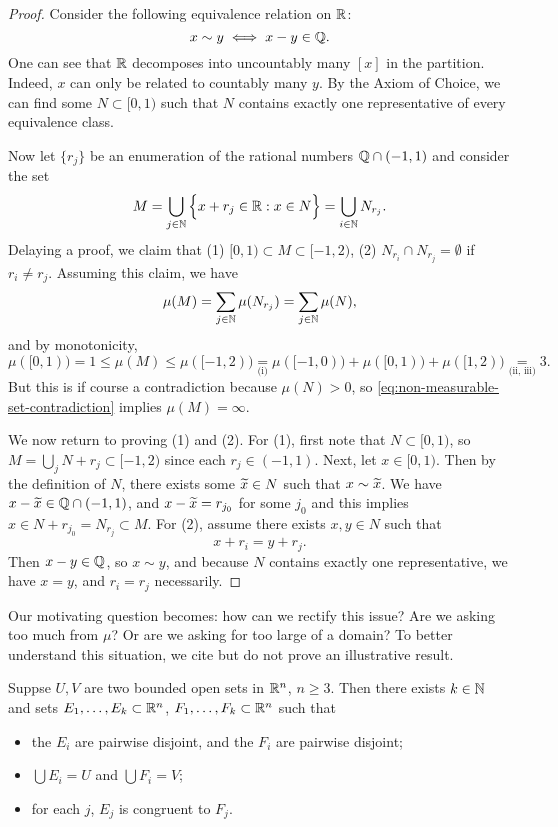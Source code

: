 \documentclass[12pt]{article} %
\begin{document}
\begin{proof}
    Consider the following equivalence relation on $\mathbb{R}$: \[x \sim y \iff x - y \in \mathbb{Q}.\] One can see that $\mathbb{R}$ decomposes into uncountably many $[x]$ in the partition. Indeed, $x$ can only be related to countably many $y$. By the Axiom of Choice, we can find some $N \subset [0,1)$ such that $N$ contains exactly one representative of every equivalence class.

    Now let $\{r_j\}$ be an enumeration of the rational numbers $\mathbb{Q} \cap (-1,1)$ and consider the set \[M = \bigcup_{j \in \mathbb{N}} \Big\{x + r_j \in \mathbb{R} : x \in N \Big\} = \bigcup_{i \in \mathbb{N}} N_{r_j}.\] Delaying a proof, we claim that (1) $[0,1) \subset M \subset [-1,2)$, (2) $N_{r_i} \cap N_{r_j} = \emptyset$ if $r_i \neq r_j$. Assuming this claim, we have \begin{align}\label{eq:non-measurable-set-contradiction}
        \mu(M) = \sum_{j \in \mathbb{N}} \mu(N_{r_j}) = \sum_{j \in \mathbb{N}} \mu(N),
    \end{align} and by monotonicity, \[\mu([0,1)) = 1 \leq \mu(M) \leq \mu([-1,2)) \underset{\text{(i)}}{=} \mu([-1,0)) + \mu([0,1)) + \mu([1,2)) \underset{\text{(ii, iii)}}{=} 3.\] But this is if course a contradiction because $\mu(N) > 0$, so \cref{eq:non-measurable-set-contradiction} implies $\mu(M) = \infty$.

    We now return to proving (1) and (2). For (1), first note that $N \subset [0,1)$, so $M = \bigcup_j N + r_j \subset [-1,2)$ since each $r_j \in (-1,1)$. Next, let $x \in [0,1)$. Then by the definition of $N$, there exists some $\widetilde{x} \in N$ such that $x \sim \widetilde{x}$. We have $x - \widetilde{x} \in \mathbb{Q} \cap (-1, 1)$, and $x-\widetilde{x} = r_{j_0}$ for some $j_0$ and this implies $x \in N + r_{j_0} = N_{r_j} \subset M$. For (2), assume there exists $x, y \in N$ such that \[x + r_i = y + r_j.\] Then $x - y \in \mathbb{Q}$, so $x \sim y$, and because $N$ contains exactly one representative, we have $x = y$, and $r_i = r_j$ necessarily.
\end{proof}

Our motivating question becomes: how can we rectify this issue? Are we asking too much from $\mu$? Or are we asking for too large of a domain? To better understand this situation, we cite but do not prove an illustrative result.

\begin{theorem}
    Suppse $U, V$ are two bounded open sets in $\mathbb{R}^n$, $n \geq 3$. Then there exists $k 
    \in \mathbb{N}$ and sets $E_1, \ldots, E_k \subset \mathbb{R}^n$, $F_1, \ldots, F_k \subset \mathbb{R}^n$ such that \begin{itemize}
        \item the $E_i$ are pairwise disjoint, and the $F_i$ are pairwise disjoint;
        \item $\bigcup E_i = U$ and $\bigcup F_i = V$;
        \item for each $j$, $E_j$ is congruent to $F_j$.
    \end{itemize}
\end{theorem}
\end{document}
